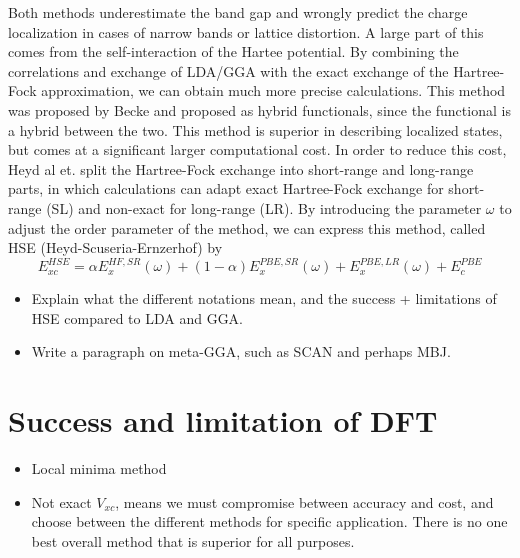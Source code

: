 Both methods underestimate the band gap and wrongly predict the charge localization in cases of narrow bands or lattice distortion. A large part of this comes from the self-interaction of the Hartee potential. By combining the correlations and exchange of LDA/GGA with the exact exchange of the Hartree-Fock approximation, we can obtain much more precise calculations. This method was proposed by Becke and proposed as hybrid functionals, since the functional is a hybrid between the two. This method is superior in describing localized states, but comes at a significant larger computational cost. In order to reduce this cost, Heyd al et. split the Hartree-Fock exchange into short-range and long-range parts, in which calculations can adapt exact Hartree-Fock exchange for short-range (SL) and non-exact for long-range (LR). By introducing the parameter $\omega$ to adjust the order parameter of the method, we can express this method, called HSE (Heyd-Scuseria-Ernzerhof) by
\begin{equation}
    E_{xc}^{HSE} = \alpha E_{x}^{HF,SR}(\omega) + (1-\alpha)E_{x}^{PBE, SR}(\omega) + E_x^{PBE,LR}(\omega) + E_{c}^{PBE}
\end{equation}
\begin{itemize}
    \item Explain what the different notations mean, and the success + limitations of HSE compared to LDA and GGA.
    \item Write a paragraph on meta-GGA, such as SCAN and perhaps MBJ.
\end{itemize}

\section{Success and limitation of DFT}
\begin{itemize}
    \item Local minima method
    \item Not exact $V_{xc}$, means we must compromise between accuracy and cost, and choose between the different methods for specific application. There is no one best overall method that is superior for all purposes. 
\end{itemize}

